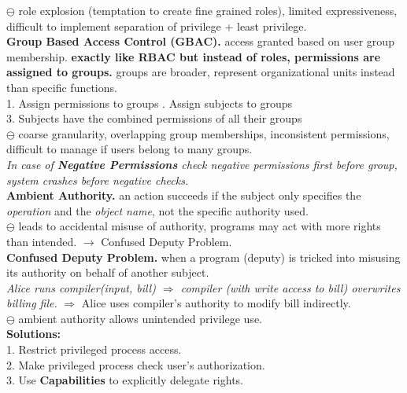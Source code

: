 \documentclass[9pt, a4paper]{extarticle}
\let\oldwarning\warning
\renewcommand{\warning}{\raisebox{0.3ex}{\oldwarning}}
\begin{document}
\begin{minipage}[t]{0.495\textwidth}
	$\ominus$ role explosion (temptation to create fine grained roles), limited expressiveness, difficult to implement separation of privilege + least privilege.\\
	\textbf{Group Based Access Control (GBAC).} access granted based on user group membership. \textbf{exactly like RBAC but instead of roles, permissions are assigned to groups.} groups are broader, represent organizational units instead than specific functions.\\
	1. Assign permissions to groups . Assign subjects to groups\\
	3. Subjects have the combined permissions of all their groups\\
	$\ominus$ coarse granularity, overlapping group memberships, inconsistent permissions, difficult to manage if users belong to many groups.\\
	\textit{In case of \textbf{Negative Permissions} check negative permissions first before group, \warning system crashes before negative checks.}\\[1px]
	\textbf{Ambient Authority.} an action succeeds if the subject only specifies the \textit{operation} and the \textit{object name}, not the specific authority used. \\
	$\ominus$ leads to accidental misuse of authority, programs may act with more rights than intended. $\rightarrow$ Confused Deputy Problem.\\
	\textbf{Confused Deputy Problem.} when a program (deputy) is tricked into misusing its authority on behalf of another subject.\\
	\textit{Alice runs compiler(input, bill) $\Rightarrow$ compiler (with write access to bill) overwrites billing file.} $\Rightarrow$ Alice uses compiler’s authority to modify bill indirectly.\\
	$\ominus$ ambient authority allows unintended privilege use.\\
	\textbf{Solutions:}\\
	1. Restrict privileged process access.\\
	2. Make privileged process check user’s authorization.\\
	3. Use \textbf{Capabilities} to explicitly delegate rights.\\
\end{minipage}
\hfill
\end{document}
